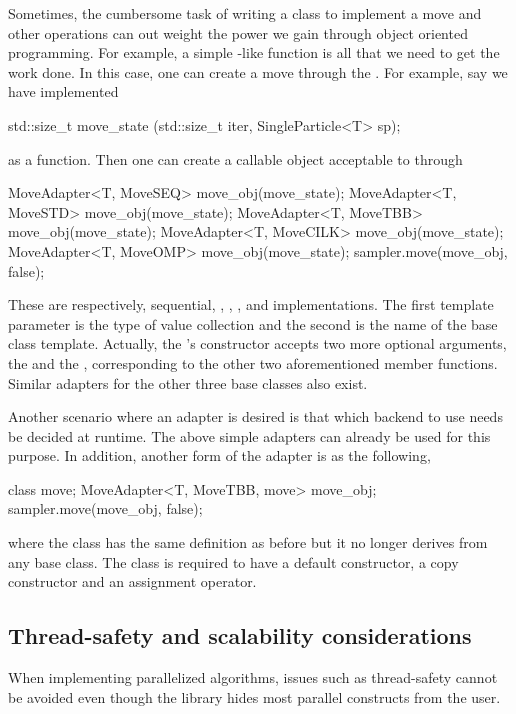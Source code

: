 Sometimes, the cumbersome task of writing a class to implement a move and
other operations can out weight the power we gain through object oriented
programming. For example, a simple -like function is all that
we need to get the work done. In this case, one can create a move through the
. For example, say we have implemented
\begin{cppcode}
std::size_t move_state (std::size_t iter, SingleParticle<T> sp);
\end{cppcode}
as a function. Then one can create a callable object acceptable to
 through
\begin{cppcode}
MoveAdapter<T, MoveSEQ>  move_obj(move_state);
MoveAdapter<T, MoveSTD>  move_obj(move_state);
MoveAdapter<T, MoveTBB>  move_obj(move_state);
MoveAdapter<T, MoveCILK> move_obj(move_state);
MoveAdapter<T, MoveOMP>  move_obj(move_state);
sampler.move(move_obj, false);
\end{cppcode}
These are respectively, sequential, \cppoo{} , \tbb, \cilk,
and \openmp implementations. The first template parameter is the type of value
collection and the second is the name of the base class template. Actually,
the 's constructor accepts two more optional arguments, the
 and the , corresponding to the other
two aforementioned member functions. Similar adapters for the other three base
classes also exist.

Another scenario where an adapter is desired is that which backend to use
needs be decided at runtime. The above simple adapters can already be used for
this purpose. In addition, another form of the adapter is as the following,
\begin{cppcode}
class move;
MoveAdapter<T, MoveTBB, move> move_obj;
sampler.move(move_obj, false);
\end{cppcode}
where the class  has the same definition as before but it no longer
derives from any base class. The class  is required to have a
default constructor, a copy constructor and an assignment operator.

\subsection{Thread-safety and scalability considerations}
\label{sub:Thread-safety and scalability considerations}

When implementing parallelized \smc algorithms, issues such as thread-safety
cannot be avoided even though the \vsmc library hides most parallel constructs
from the user.

